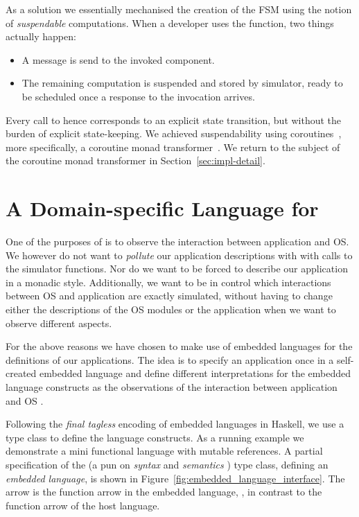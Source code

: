 As a solution we essentially mechanised the creation of the FSM using the notion of \emph{suspendable} computations.
When a developer uses the  function, two things actually happen:
\begin{itemize}
  \item A message is send to the invoked component.
  \item The remaining computation is suspended and stored by simulator, ready to be scheduled once a response to the invocation arrives.
\end{itemize}
Every call to  hence corresponds to an explicit state transition, but without the burden of explicit state-keeping.
We achieved suspendability using coroutines~\cite{coroutines}, more specifically, a coroutine monad transformer~\cite{cmt}.
We return to the subject of the coroutine monad transformer in Section~\ref{sec:impl-detail}.

\section{A Domain-specific Language for \soosim}
\label{sec:dsl}
One of the purposes of \soosim is to observe the interaction between application and OS.
We however do not want to \emph{pollute} our application descriptions with with calls to the simulator functions.
Nor do we want to be forced to describe our application in a monadic style.
Additionally, we want to be in control which interactions between OS and application are exactly simulated, without having to change either the descriptions of the OS modules or the application when we want to observe different aspects.

For the above reasons we have chosen to make use of embedded languages for the definitions of our applications.
The idea is to specify an application once in a self-created embedded language and define different interpretations for the embedded language constructs as the observations of the interaction between application and OS \cite{Hofer:2008:PED:1449913.1449935}. 

Following the \emph{final tagless} \cite{final_tagless_embedding} encoding of embedded languages in Haskell, we use a type class to define the language constructs.
As a running example we demonstrate a mini functional language with mutable references.
A partial specification of the  (a pun on \emph{syntax} and \emph{semantics} \cite{final_tagless_embedding}) type class, defining an \emph{embedded language}, is shown in Figure~\ref{fig:embedded_language_interface}.
The arrow \cd{:->} is the function arrow in the embedded language, \eg {}, in contrast to the function arrow \cd{->} of the host language.

